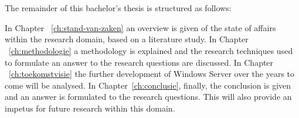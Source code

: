 \section{}
\label{sec:opzet-bachelorproef}

The remainder of this bachelor's thesis is structured as follows:

In Chapter ~\ref{ch:stand-van-zaken} an overview is given of the state of affairs within the research domain, based on a literature study.
In Chapter ~\ref{ch:methodologie} a methodology is explained and the research techniques used to formulate an answer to the research questions are discussed.
In Chapter ~\ref{ch:toekomstvisie} the further development of Windows Server over the years to come will be analysed. 
In Chapter~\ref{ch:conclusie}, finally, the conclusion is given and an answer is formulated to the research questions. This will also provide an impetus for future research within this domain.